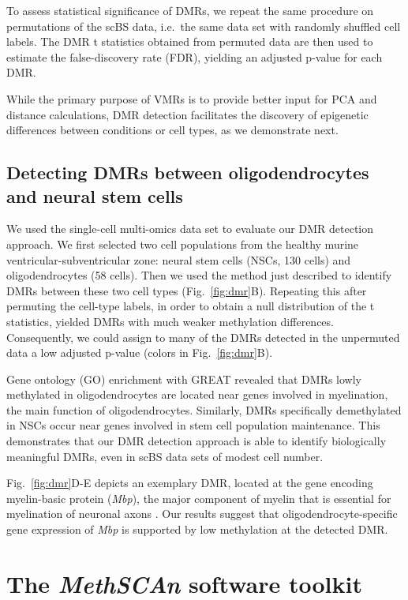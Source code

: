 \documentclass[10pt]{article}
\begin{document}
To assess statistical significance of DMRs, we repeat the same procedure on permutations of the scBS data, i.e.\ the same data set with randomly shuffled cell labels.
The DMR t statistics obtained from permuted data are then used to estimate the false-discovery rate (FDR), yielding an adjusted p-value for each DMR.

While the primary purpose of VMRs is to provide better input for PCA and distance calculations, DMR detection facilitates the discovery of epigenetic differences between conditions or cell types, as we demonstrate next.


\subsection*{Detecting DMRs between oligodendrocytes and neural stem cells}

We used the single-cell multi-omics data set \citep{kremer_scnmt} to evaluate our DMR detection approach.
We first selected two cell populations from the healthy murine ventricular-subventricular zone: neural stem cells (NSCs, 130 cells) and oligodendrocytes (58 cells).
Then we used the method just described to identify DMRs between these two cell types (Fig.~\ref{fig:dmr}B).
Repeating this after permuting the cell-type labels, in order to obtain a null distribution of the t statistics, yielded DMRs with much weaker methylation differences.
Consequently, we could assign to many of the DMRs detected in the unpermuted data a low adjusted p-value (colors in Fig.~\ref{fig:dmr}B).

Gene ontology (GO) enrichment with GREAT \citep{mclean2010great} revealed that DMRs lowly methylated in oligodendrocytes are located near genes involved in myelination, the main function of oligodendrocytes.
Similarly, DMRs specifically demethylated in NSCs occur near genes involved in stem cell population maintenance.
This demonstrates that our DMR detection approach is able to identify biologically meaningful DMRs, even in scBS data sets of modest cell number.

Fig.~\ref{fig:dmr}D-E depicts an exemplary DMR, located at the gene encoding myelin-basic protein (\textit{Mbp}), the major component of myelin that is essential for myelination of neuronal axons \citep{mbp}.
Our results suggest that oligodendrocyte-specific gene expression of \textit{Mbp} is supported by low methylation at the detected DMR.


\section*{The \textit{MethSCAn} software toolkit}
\end{document}
